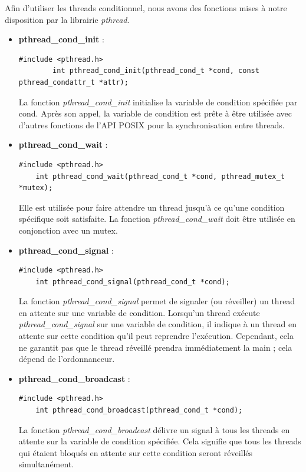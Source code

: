Afin d'utiliser les threads conditionnel, nous avons des fonctions mises à notre disposition par la librairie \textit{pthread}. 
\vspace{\baselineskip}
\begin{itemize}
    \item \textbf{pthread\_cond\_init} : 
    \vspace{\baselineskip}
    \begin{lstlisting}[title = Initialisation mutex conditionnel]
    #include <pthread.h>
        int pthread_cond_init(pthread_cond_t *cond, const pthread_condattr_t *attr);
    \end{lstlisting}
    
    La fonction \textit{pthread\_cond\_init} initialise la variable de condition spécifiée par cond. Après son appel, la variable de condition est prête à être utilisée avec d'autres fonctions de l'API POSIX pour la synchronisation entre threads.
    \\
    \item \textbf{pthread\_cond\_wait} : 
    \vspace{\baselineskip}
    \begin{lstlisting}[title = Wait mutex conditionel]
#include <pthread.h>
    int pthread_cond_wait(pthread_cond_t *cond, pthread_mutex_t *mutex);
    \end{lstlisting}

    Elle est utilisée pour faire attendre un thread jusqu'à ce qu'une condition spécifique soit satisfaite. La fonction \textit{pthread\_cond\_wait} doit être utilisée en conjonction avec un mutex.
    \\
    \item \textbf{pthread\_cond\_signal} : 
    \vspace{\baselineskip}
    \begin{lstlisting}[title = Signal mutex conditionnel]
#include <pthread.h>
    int pthread_cond_signal(pthread_cond_t *cond);
    \end{lstlisting}

    La fonction \textit{pthread\_cond\_signal} permet de signaler (ou réveiller) un thread en attente sur une variable de condition. Lorsqu'un thread exécute \textit{pthread\_cond\_signal} sur une variable de condition, il indique à un thread en attente sur cette condition qu'il peut reprendre l'exécution. Cependant, cela ne garantit pas que le thread réveillé prendra immédiatement la main ; cela dépend de l'ordonnanceur.
     \vspace{\baselineskip}
    \item \textbf{pthread\_cond\_broadcast} : 
    \vspace{\baselineskip}
    \begin{lstlisting}[title = Broadcast mutex conditionnel]
#include <pthread.h>
    int pthread_cond_broadcast(pthread_cond_t *cond);
    \end{lstlisting}

    La fonction \textit{pthread\_cond\_broadcast} délivre un signal à tous les threads en attente sur la variable de condition spécifiée. Cela signifie que tous les threads qui étaient bloqués en attente sur cette condition seront réveillés simultanément.
\end{itemize}
